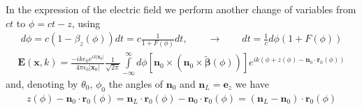 In the expression of the electric field we perform another change of variables from $ct$ to $\phi=ct-z$, using
\begin{align}
    d\phi = c (1-\beta_z(\phi)) dt = c\frac1{1+F(\phi)} dt,\qquad \rightarrow \qquad dt=\frac1c d\phi(1+F(\phi))
\end{align}
\begin{align}
    {\bm E}({\bm x},k) =\frac{-i k e_0 e^{ik |{\bm x}_0|}}{4\pi\epsilon_0|{\bm x}_0|}\frac1{\sqrt{2\pi}}\int\limits_{-\infty}^{\infty}d\phi\left[{{\bm n}_0\times({\bm n}_0\times\tilde{\boldsymbol\beta}(\phi))}\right]e^{ik(\phi +z(\phi)-{{\bm n}_0\cdot{\bm r}_0(\phi)})}
\end{align}
and, denoting by $\theta_0$, $\phi_0$ the angles of ${\bm n}_0$ and ${\bm n}_L={\bm e}_z$
we have
\begin{align}
    z(\phi)-{\bm n}_0\cdot{\bm r}_0(\phi)={\bm n}_L\cdot{\bm r}_0(\phi)-{\bm n}_0\cdot{\bm r}_0(\phi)=({\bm n}_L-{\bm n}_0)\cdot{\bm r}_0(\phi)
\end{align}


